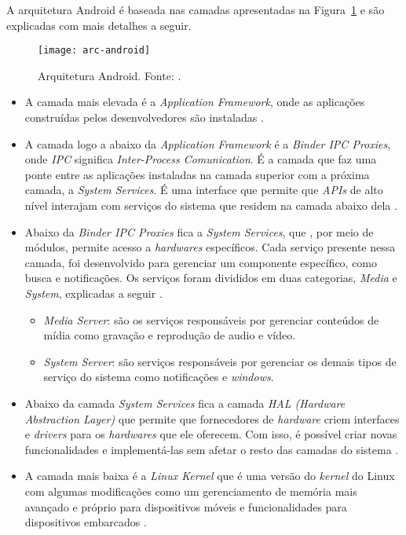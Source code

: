 A arquitetura Android é baseada nas camadas apresentadas na Figura~\ref{fig:arc-android} e são explicadas com mais detalhes a seguir.

\begin{figure}[H]
	\centering
	\texttt{[image: arc-android]}
	\caption[Arquitetura Android]{ Arquitetura Android. Fonte: \cite{android_android_2016}.}
	\label{fig:arc-android}
\end{figure}

\begin{itemize}

    \item A camada mais elevada é a \textit{Application Framework}, onde as aplicações construídas pelos desenvolvedores são instaladas \cite{android_android_2016}.
    \item A camada logo a abaixo da \textit{Application Framework} é a \textit{Binder IPC Proxies}, onde \textit{IPC} significa \textit{Inter-Process Comunication}.
    É a camada que faz uma ponte entre as aplicações instaladas na camada superior com a próxima camada, a \textit{System Services}. É uma interface que permite que \textit{APIs}
    de alto nível interajam com serviços do sistema que residem na camada abaixo dela \cite{android_android_2016}. 
    \item Abaixo da \textit{Binder IPC Proxies} fica a \textit{System Services}, que , por meio de módulos, permite acesso a \textit{hardwares} específicos. Cada serviço presente nessa camada,
    foi desenvolvido para gerenciar um componente específico, como busca e notificações. Os serviços foram divididos em duas categorias, \textit{Media} e \textit{System}, explicadas a seguir \cite{android_android_2016}.
    \begin{itemize}
        \item \textit{Media Server}: são os serviços responsáveis por gerenciar conteúdos de mídia como gravação e reprodução de audio e vídeo. 
        \item \textit{System Server}: são serviços responsáveis por gerenciar os demais tipos de serviço do sistema como notificações e \textit{windows}.
    \end{itemize}
    \item Abaixo da camada \textit{System Services} fica a camada \textit{HAL (Hardware Abstraction Layer)} que permite que fornecedores de \textit{hardware} criem interfaces e \textit{drivers} para os \textit{hardwares} que
    ele oferecem. Com isso, é possível criar novas funcionalidades e implementá-las sem afetar o resto das camadas do sistema \cite{android_android_2016}.  
    \item A camada mais baixa é a \textit{Linux Kernel} que é uma versão do \textit{kernel} do Linux com algumas modificações como um gerenciamento de memória mais avançado e próprio para dispositivos 
    móveis e funcionalidades para dispositivos embarcados \cite{android_android_2016}. 
    
\end{itemize}

